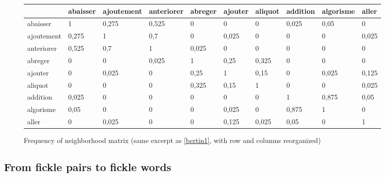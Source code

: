 \documentclass[preprint]{elsarticle}
\begin{document}
\begin{figure}
\begin{small}

\begin{tabular}{|l|l|l|l|l|l|l|l|l|l|}
\hline
 & abaisser & ajoutement & anteriorer& abreger & ajouter & aliquot & addition & algorisme & aller \\ \hline
abaisser  & \cellcolor{gris} 1 & \cellcolor{gris} 0,275 & \cellcolor{gris} 0,525 & 0 & 0 & 0 & \cellcolor{grisclair} 0,025 & \cellcolor{grisclair} 0,05 & 0 \\ \hline
ajoutement  & \cellcolor{gris} 0,275 & \cellcolor{gris} 1 & \cellcolor{gris} 0,7 & 0 & \cellcolor{grisclair} 0,025 & 0 & 0 & 0 & \cellcolor{grisclair} 0,025 \\ \hline
anteriorer & \cellcolor{gris} 0,525 & \cellcolor{gris} 0,7 & \cellcolor{gris} 1 & \cellcolor{grisclair} 0,025 & 0 & 0 & 0 & 0 & 0 \\ \hline
abreger & 0 & 0 &\cellcolor{grisclair} 0,025& \cellcolor{gris} 1 & \cellcolor{gris} 0,25 & \cellcolor{gris} 0,325 & 0 & 0 & 0 \\ \hline
ajouter & 0 & \cellcolor{grisclair} 0,025 & 0& \cellcolor{gris} 0,25 & \cellcolor{gris} 1 & \cellcolor{grisclair} 0,15 & 0 & \cellcolor{grisclair} 0,025 & \cellcolor{grisclair} 0,125 \\ \hline
aliquot & 0 & 0 & 0& \cellcolor{gris} 0,325 & \cellcolor{grisclair} 0,15 & \cellcolor{gris} 1 & 0 & 0 & \cellcolor{grisclair} 0,025 \\ \hline
addition & \cellcolor{grisclair} 0,025 & 0 & 0& 0 & 0 & 0 & \cellcolor{gris} 1 & \cellcolor{gris} 0,875 & \cellcolor{grisclair} 0,05 \\ \hline
algorisme & \cellcolor{grisclair} 0,05 & 0 & 0& 0 & \cellcolor{grisclair} 0,025 & 0 & \cellcolor{gris} 0,875 & \cellcolor{gris} 1 & 0 \\ \hline
aller & 0 & \cellcolor{grisclair} 0,025 & 0& 0 & \cellcolor{grisclair} 0,125 & \cellcolor{grisclair} 0,025 & \cellcolor{grisclair} 0,05 & 0 & \cellcolor{gris} 1 \\ \hline
\end{tabular}
\end{small}
\caption{Frequency of neighborhood matrix (same excerpt as \ref{bertin1}, with row and columns reorganized)}
\label{bertin2}
\end{figure}

\subsection{From fickle pairs to fickle words}
\label{fromfrom}
\end{document}
